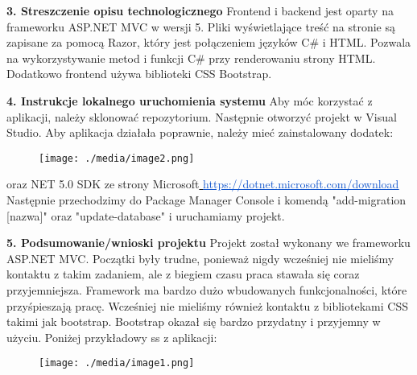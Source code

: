 \documentclass[12pt]{article}
\renewcommand{\_}{\kern-1.5pt\textunderscore\kern-1.5pt}
\begin{document}
\textbf{3. Streszczenie opisu technologicznego}
Frontend i backend jest oparty na frameworku ASP.NET MVC w wersji 5. Pliki wyświetlające treść na stronie są zapisane za pomocą Razor, który jest połączeniem języków C$\#$  i HTML. Pozwala na wykorzystywanie metod i funkcji C$\#$  przy renderowaniu strony HTML. Dodatkowo frontend używa biblioteki CSS Bootstrap.

\vspace{\baselineskip}

\vspace{\baselineskip}

\vspace{\baselineskip}

\vspace{\baselineskip}
\textbf{4. Instrukcje lokalnego uruchomienia systemu}
Aby móc korzystać z aplikacji, należy sklonować repozytorium. Następnie otworzyć projekt w Visual Studio. Aby aplikacja działała poprawnie, należy mieć zainstalowany dodatek:



\begin{figure}[H]
	\begin{Center}
		\texttt{[image: ./media/image2.png]}
	\end{Center}
\end{figure}




\vspace{\baselineskip}oraz NET 5.0 SDK ze strony Microsoft\href{https://dotnet.microsoft.com/download}{ }\href{https://dotnet.microsoft.com/download}{\textcolor[HTML]{1155CC}{\ul{https://dotnet.microsoft.com/download}}} Następnie przechodzimy do Package Manager Console i komendą "add-migration [nazwa]" oraz "update-database" i uruchamiamy projekt.

\vspace{\baselineskip}
\textbf{5. Podsumowanie/wnioski projektu}
Projekt został wykonany we frameworku ASP.NET MVC. Początki były trudne, ponieważ nigdy wcześniej nie mieliśmy kontaktu z takim zadaniem, ale z biegiem czasu praca stawała się coraz przyjemniejsza. Framework ma bardzo dużo wbudowanych funkcjonalności, które przyśpieszają pracę. Wcześniej nie mieliśmy również kontaktu z bibliotekami CSS takimi jak bootstrap. Bootstrap okazał się bardzo przydatny i przyjemny w użyciu. Poniżej przykładowy ss z aplikacji:



\begin{figure}[H]
	\begin{Center}
		\texttt{[image: ./media/image1.png]}
	\end{Center}
\end{figure}




\vspace{\baselineskip}\printbibliography
\end{document}
